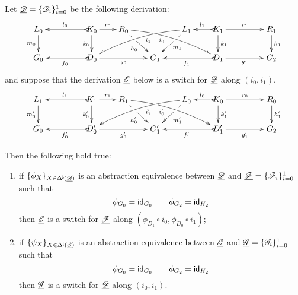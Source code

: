 \begin{proposition}\label{prop:switchabs}
	Let $\underline{\mathscr{D}}=\{\mathscr{D}_i\}_{i=0}^1$ be the following derivation:
\[\xymatrix@R=20pt@C=20pt{L_0 \ar[d]_{m_0}&& K_0
	\ar[d]_{k_0}\ar@{>->}[ll]_{l_0} \ar[r]^{r_0} & R_0
	\ar@{>}@/^.25cm/[drrr]|(.32)\hole_(.4){i_0}
	\ar[dr]|(.33)\hole_{h_0} && L_1 \ar@{>}@/_.25cm/[dlll]^(.4){i_1}
	\ar[dl]|(.33)\hole^{m_1}& K_1 \ar[d]^{k_1}\ar@{>->}[l]_{l_1}
	\ar[rr]^{r_1} && R_1 \ar[d]^{h_1}\\G_0 && \ar@{>->}[ll]^{f_0}
	D_0 \ar[rr]_{g_0}&& G_1 && \ar@{>->}[ll]^{f_1} D_1
	\ar[rr]_{g_1}&& G_2}
\]
and suppose that the derivation $\underline{\mathscr{E}}$ below is a switch for $\underline{\mathscr{D}}$ along $(i_0,i_1)$.
\[
\xymatrix@R=20pt@C=20pt{
	{L_1} \ar[d]_{m_0'}
	&&  {K_1} \ar@{>->}[ll]_{l_1} \ar[r]^{r_1} \ar[d]_{k_0'}
	&  {R_1} \ar[dr]|(.33)\hole_{h_0'}  \ar@/^.25cm/@{>}_(.4){i_0'}|(.32)\hole[drrr]
	& & 
	{L_0}\ar[dl]|(.33)\hole^{m_1'} \ar@/_.25cm/@{>}^(.4){i_1'}[dlll] 
	&  {K_0} \ar@{>->}[l]_{l_0} \ar[rr]^{r_0} \ar[d]^{k_1'}
	& & {R_0} \ar[d]^{h_1'} \\		
	{G_0}
	& & {D_0'} \ar@{>->}[ll]^{f_0'} \ar[rr]_{g_0'}
	& &  {G'_1} 
	& &  {D_1'} \ar@{>->}[ll]^{f_1'} \ar[rr]_{g_1'}
	& & {G_2}  }
\]

Then the following hold true:
\begin{enumerate}
	\item if $\{\phi_X\}_{X\in \Delta^{\hspace{-1pt}\downarrow\hspace{-1pt}}(\underline{\mathscr{D}})}$ is an abstraction equivalence between $\underline{\mathscr{D}}$ and $\underline{\mathscr{F}}=\{\mathscr{F}_i\}_{i=0}^1$ such that
	\[\phi_{G_0}=\mathsf{id}_{G_0} \qquad \phi_{G_2}=\mathsf{id}_{H_2}\] 
	then $\underline{\mathscr{E}}$ is a switch for $\underline{\mathscr{F}}$ along $(\phi_{D_1}\circ i_0, \phi_{D_0}\circ i_1 )$;
	\item if $\{\psi_X\}_{X\in \Delta^{\hspace{-1pt}\downarrow\hspace{-1pt}}(\underline{\mathscr{E}})}$ is an abstraction equivalence between $\underline{\mathscr{E}}$ and $\underline{\mathscr{G}}=\{\mathscr{G}_{i}\}_{i=0}^1$ such that 
	\[\phi_{G_0}=\mathsf{id}_{G_0} \qquad \phi_{G_2}=\mathsf{id}_{H_2}\] 
	 then $\underline{\mathscr{G}}$ is a switch for $\underline{\mathscr{D}}$ along $(i_0, i_1)$.
	\end{enumerate}
\end{proposition}

